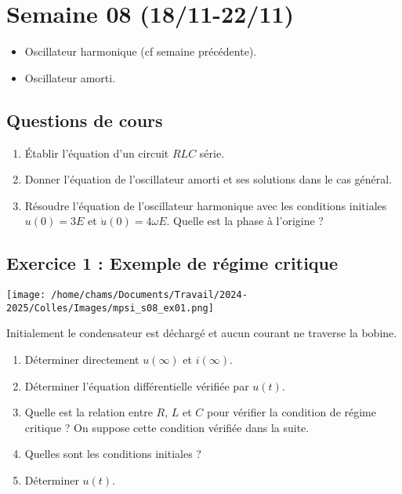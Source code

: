 \section{Semaine 08 (18/11-22/11) }


\begin{itemize}
	\item Oscillateur harmonique (cf semaine précédente).
	\item Oscillateur amorti.
\end{itemize}

\subsection{Questions de cours}

\begin{enumerate}
	\item Établir l'équation d'un circuit $RLC$ série.
	\item Donner l'équation de l'oscillateur amorti et ses solutions dans le cas général.
	\item Résoudre l'équation de l'oscillateur harmonique avec les conditions initiales $u(0)=3E$ et $\dot{u}(0)=4 \omega E$. Quelle est la phase à l'origine ?
\end{enumerate}

\subsection{Exercice 1 : Exemple de régime critique}

\begin{minipage}[c]{\linewidth/2}
	\texttt{[image: /home/chams/Documents/Travail/2024-2025/Colles/Images/mpsi\_s08\_ex01.png]}
\end{minipage}%
\begin{minipage}[c]{\linewidth/2}
	Initialement le condensateur est déchargé et aucun courant ne traverse la bobine.
\end{minipage}

\begin{enumerate}
	\item Déterminer directement $u(\infty)$ et $i(\infty)$.
	\item Déterminer l'équation différentielle vérifiée par $u(t)$.
	\item Quelle est la relation entre $R$, $L$ et $C$ pour vérifier la condition de régime critique ? On suppose cette condition vérifiée dans la suite.
	\item Quelles sont les conditions initiales ?
	\item Déterminer $u(t)$.
\end{enumerate}

